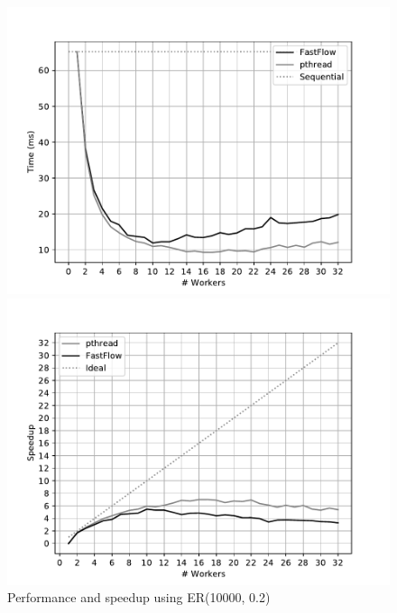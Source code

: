 \begin{figure}[!htb]
    \centering
    \begin{minipage}{0.48\textwidth}
        \includegraphics[width=\textwidth]{plots/fastflow_performance_02_time.pdf}
    \end{minipage}
    \begin{minipage}{0.48\textwidth}
        \includegraphics[width=\textwidth]{plots/fastflow_speedup_02_time.pdf}
    \end{minipage}
    \begin{minipage}{1\textwidth}
    \caption{Performance and speedup using ER(10000, 0.2)}
    \label{fig:perf_02}
    \end{minipage}
    \begin{minipage}{0.48\textwidth}

\end{minipage}
\end{figure}
